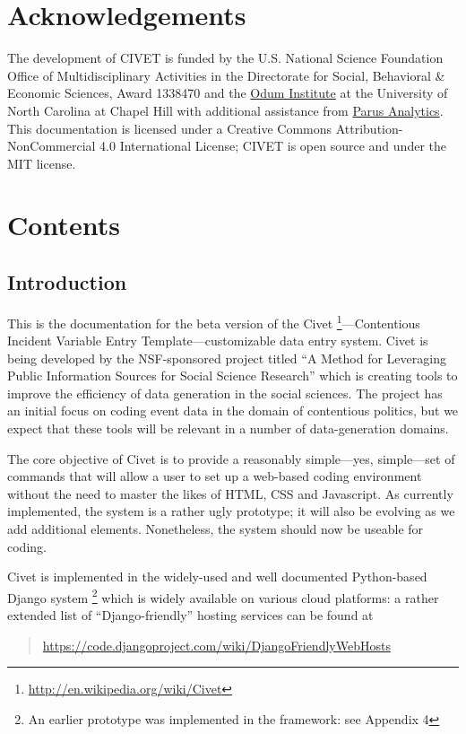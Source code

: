 \documentclass[letterpaper,10pt,english]{sphinxmanual}
\begin{document}
\part{Acknowledgements}
\label{index:welcome}\label{index:acknowledgements}
The development of CIVET is funded by the U.S. National Science Foundation Office of Multidisciplinary Activities
in the Directorate for Social, Behavioral \& Economic Sciences, Award 1338470 and the \href{http://www.odum.unc.edu/odum/home2.jsp}{Odum Institute} at the University of North Carolina at Chapel Hill with additional assistance from \href{http://parusanalytics.com/}{Parus Analytics}. This documentation is licensed under a Creative Commons Attribution-NonCommercial 4.0 International License; CIVET is open source and under the MIT license.


\part{Contents}
\label{index:contents}

\chapter{Introduction}
\label{intro:introduction}\label{intro::doc}
This is the documentation for the beta version of the
Civet \footnote{
\href{http://en.wikipedia.org/wiki/Civet}{http://en.wikipedia.org/wiki/Civet}
}—Contentious Incident Variable Entry Template—customizable
data entry system. Civet is being developed by the NSF-sponsored project
titled “A Method for Leveraging Public Information Sources for Social
Science Research” which is creating tools to improve the efficiency of
data generation in the social sciences. The project has an initial focus
on coding event data in the domain of contentious politics, but we
expect that these tools will be relevant in a number of data-generation
domains.

The core objective of Civet is to provide a reasonably simple—yes,
simple—set of commands that will allow a user to set up a web-based
coding environment without the need to master the likes of HTML, CSS and
Javascript. As currently implemented, the system is a rather ugly
prototype; it will also be evolving as we add additional elements.
Nonetheless, the system should now be useable for coding.

Civet is implemented in the widely-used and well documented
Python-based Django system \footnote{
An earlier prototype was implemented in the  framework: see
Appendix 4
} which is widely available on various
cloud platforms: a rather extended list of “Django-friendly” hosting
services can be found at
\begin{quote}

\href{https://code.djangoproject.com/wiki/DjangoFriendlyWebHosts}{https://code.djangoproject.com/wiki/DjangoFriendlyWebHosts}
\end{quote}
\end{document}
